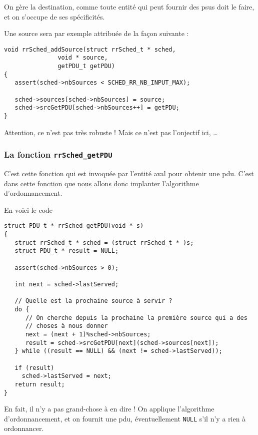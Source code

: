    On gère la destination, comme toute entité qui peut fournir des
{\sc psu}s doit le faire, et on s'occupe de ses spécificités.

    Une source sera par exemple attribuée de la façon suivante :

\begin{verbatim}
void rrSched_addSource(struct rrSched_t * sched,
		       void * source,
		       getPDU_t getPDU)
{
   assert(sched->nbSources < SCHED_RR_NB_INPUT_MAX);

   sched->sources[sched->nbSources] = source;
   sched->srcGetPDU[sched->nbSources++] = getPDU;
}
\end{verbatim}

   Attention, ce n'est pas très robuste ! Mais ce n'est pas l'onjectif
ici, \ldots

%
\subsubsection{La fonction {\tt rrSched\_getPDU}}

   C'est cette fonction qui est invoquée par l'entité aval pour
obtenir une {\sc pdu}. C'est dans cette fonction que nous allons donc
implanter l'algorithme d'ordonnancement.

   En voici le code

\begin{verbatim}
struct PDU_t * rrSched_getPDU(void * s)
{
   struct rrSched_t * sched = (struct rrSched_t * )s;
   struct PDU_t * result = NULL;

   assert(sched->nbSources > 0);

   int next = sched->lastServed;

   // Quelle est la prochaine source à servir ?
   do {
      // On cherche depuis la prochaine la première source qui a des
      // choses à nous donner
      next = (next + 1)%sched->nbSources;
      result = sched->srcGetPDU[next](sched->sources[next]);
   } while ((result == NULL) && (next != sched->lastServed));

   if (result)
     sched->lastServed = next;
   return result;
}
\end{verbatim}

   En fait, il n'y a pas grand-chose à en dire ! On applique
l'algorithme d'ordonnancement, et on fournit une {\sc pdu},
éventuellement {\tt NULL} s'il n'y a rien à ordonnancer.

